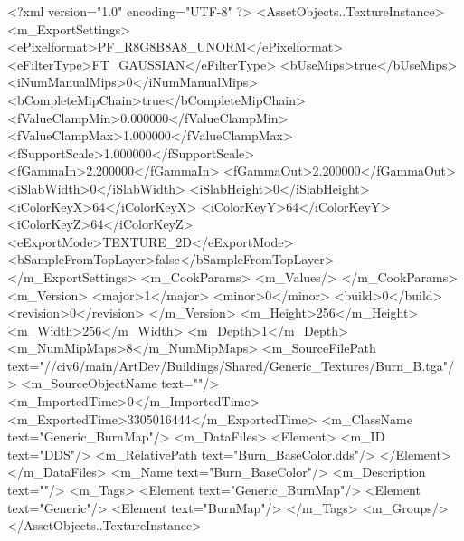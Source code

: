 <?xml version="1.0" encoding="UTF-8" ?>
<AssetObjects..TextureInstance>
	<m_ExportSettings>
		<ePixelformat>PF_R8G8B8A8_UNORM</ePixelformat>
		<eFilterType>FT_GAUSSIAN</eFilterType>
		<bUseMips>true</bUseMips>
		<iNumManualMips>0</iNumManualMips>
		<bCompleteMipChain>true</bCompleteMipChain>
		<fValueClampMin>0.000000</fValueClampMin>
		<fValueClampMax>1.000000</fValueClampMax>
		<fSupportScale>1.000000</fSupportScale>
		<fGammaIn>2.200000</fGammaIn>
		<fGammaOut>2.200000</fGammaOut>
		<iSlabWidth>0</iSlabWidth>
		<iSlabHeight>0</iSlabHeight>
		<iColorKeyX>64</iColorKeyX>
		<iColorKeyY>64</iColorKeyY>
		<iColorKeyZ>64</iColorKeyZ>
		<eExportMode>TEXTURE_2D</eExportMode>
		<bSampleFromTopLayer>false</bSampleFromTopLayer>
	</m_ExportSettings>
	<m_CookParams>
		<m_Values/>
	</m_CookParams>
	<m_Version>
		<major>1</major>
		<minor>0</minor>
		<build>0</build>
		<revision>0</revision>
	</m_Version>
	<m_Height>256</m_Height>
	<m_Width>256</m_Width>
	<m_Depth>1</m_Depth>
	<m_NumMipMaps>8</m_NumMipMaps>
	<m_SourceFilePath text="//civ6/main/ArtDev/Buildings/Shared/Generic_Textures/Burn_B.tga"/>
	<m_SourceObjectName text=""/>
	<m_ImportedTime>0</m_ImportedTime>
	<m_ExportedTime>3305016444</m_ExportedTime>
	<m_ClassName text="Generic_BurnMap"/>
	<m_DataFiles>
		<Element>
			<m_ID text="DDS"/>
			<m_RelativePath text="Burn_BaseColor.dds"/>
		</Element>
	</m_DataFiles>
	<m_Name text="Burn_BaseColor"/>
	<m_Description text=""/>
	<m_Tags>
		<Element text="Generic_BurnMap"/>
		<Element text="Generic"/>
		<Element text="BurnMap"/>
	</m_Tags>
	<m_Groups/>
</AssetObjects..TextureInstance>

